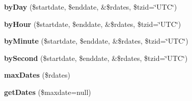 \begin{DoxyCompactItemize}
\item 
\mbox{\label{class_z_c_recurring_date_a83a5d516f74e8f2ce1f6f639499794ab}} 
{\bfseries by\+Day} (\$startdate, \$enddate, \&\$rdates, \$tzid=\char`\"{}U\+TC\char`\"{})
\item 
\mbox{\label{class_z_c_recurring_date_aa702a8f015f9aac072896939c756c4aa}} 
{\bfseries by\+Hour} (\$startdate, \$enddate, \&\$rdates, \$tzid=\char`\"{}U\+TC\char`\"{})
\item 
\mbox{\label{class_z_c_recurring_date_ac60037133b4ab6795ef7c0020a7b6d8c}} 
{\bfseries by\+Minute} (\$startdate, \$enddate, \&\$rdates, \$tzid=\char`\"{}U\+TC\char`\"{})
\item 
\mbox{\label{class_z_c_recurring_date_a4ed57b69778a31c3cdcb6a70c72beb46}} 
{\bfseries by\+Second} (\$startdate, \$enddate, \&\$rdates, \$tzid=\char`\"{}U\+TC\char`\"{})
\item 
\mbox{\label{class_z_c_recurring_date_aca1750f202e81bef9e47ce9991a944b3}} 
{\bfseries max\+Dates} (\$rdates)
\item 
\mbox{\label{class_z_c_recurring_date_aa6141c09733bd5c1c9a125ae0b5a8045}} 
{\bfseries get\+Dates} (\$maxdate=null)
\end{DoxyCompactItemize}
